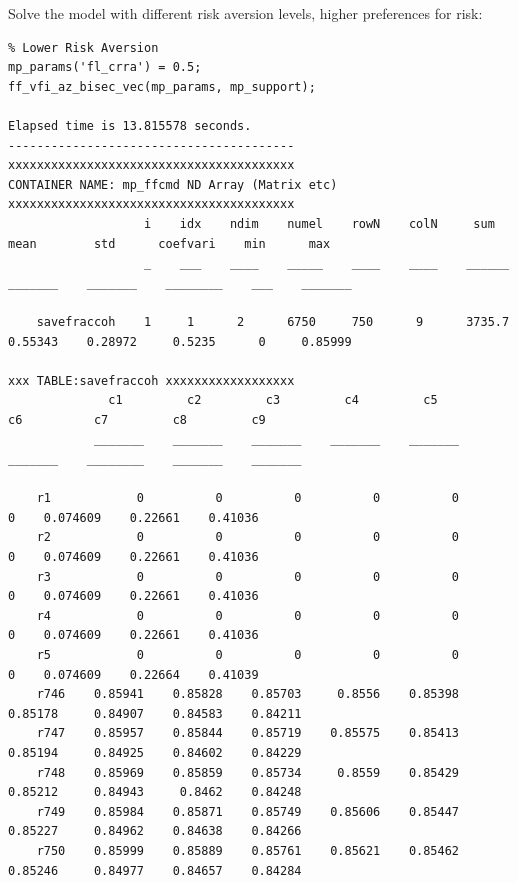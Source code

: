 \documentclass[
]{book}
\begin{document}
Solve the model with different risk aversion levels, higher preferences
for risk:

\begin{verbatim}
% Lower Risk Aversion
mp_params('fl_crra') = 0.5;
ff_vfi_az_bisec_vec(mp_params, mp_support);

Elapsed time is 13.815578 seconds.
----------------------------------------
xxxxxxxxxxxxxxxxxxxxxxxxxxxxxxxxxxxxxxxx
CONTAINER NAME: mp_ffcmd ND Array (Matrix etc)
xxxxxxxxxxxxxxxxxxxxxxxxxxxxxxxxxxxxxxxx
                   i    idx    ndim    numel    rowN    colN     sum       mean        std      coefvari    min      max  
                   _    ___    ____    _____    ____    ____    ______    _______    _______    ________    ___    _______

    savefraccoh    1     1      2      6750     750      9      3735.7    0.55343    0.28972     0.5235      0     0.85999

xxx TABLE:savefraccoh xxxxxxxxxxxxxxxxxx
              c1         c2         c3         c4         c5         c6          c7         c8         c9   
            _______    _______    _______    _______    _______    _______    ________    _______    _______

    r1            0          0          0          0          0          0    0.074609    0.22661    0.41036
    r2            0          0          0          0          0          0    0.074609    0.22661    0.41036
    r3            0          0          0          0          0          0    0.074609    0.22661    0.41036
    r4            0          0          0          0          0          0    0.074609    0.22661    0.41036
    r5            0          0          0          0          0          0    0.074609    0.22664    0.41039
    r746    0.85941    0.85828    0.85703     0.8556    0.85398    0.85178     0.84907    0.84583    0.84211
    r747    0.85957    0.85844    0.85719    0.85575    0.85413    0.85194     0.84925    0.84602    0.84229
    r748    0.85969    0.85859    0.85734     0.8559    0.85429    0.85212     0.84943     0.8462    0.84248
    r749    0.85984    0.85871    0.85749    0.85606    0.85447    0.85227     0.84962    0.84638    0.84266
    r750    0.85999    0.85889    0.85761    0.85621    0.85462    0.85246     0.84977    0.84657    0.84284
\end{verbatim}
\end{document}
